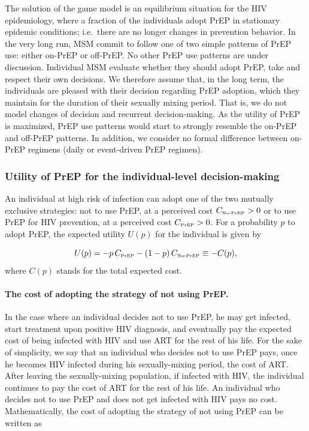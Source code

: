 \documentclass[12pt]{article}
\begin{document}
The solution of the game model is an equilibrium situation for the HIV epidemiology, where a fraction of the individuals adopt PrEP in stationary epidemic conditions; i.e.~there are no longer changes in prevention behavior. {In the very long run, MSM commit to follow one of two simple patterns of PrEP use: either on-PrEP or off-PrEP. No other PrEP use patterns are under discussion. Individual MSM evaluate whether they should adopt PrEP, take and respect their own decisions. We therefore assume that, in the long term, the individuals are pleased with their decision regarding PrEP adoption, which they maintain for the duration of their sexually mixing period. That is, we do not model changes of decision and recurrent decision-making.  As the utility of PrEP is maximized, PrEP use patterns would start to strongly resemble the on-PrEP and off-PrEP patterns. In addition, we consider no formal difference between on-PrEP regimens (daily or event-driven PrEP regimen).  
}

\subsubsection{Utility of PrEP for the individual-level decision-making} \label{sec:Utility}

An individual at high risk of infection can adopt one of the two mutually exclusive strategies: not to use PrEP, at a perceived cost $C_{\text{\tiny No-PrEP}}>0$ or to use PrEP for HIV prevention, at a perceived cost $C_{\text{\tiny PrEP}}>0$. For a probability $p$ to adopt PrEP, the expected utility $U(p)$ for the individual is given by 

\begin{equation}
	U(p) = - p \, C_{\text{\tiny PrEP}} - (1- p) \, C_{\text{\tiny No-PrEP}}\equiv-C(p), 
\end{equation}
where $C(p)$ stands for the total expected cost.

\paragraph{The cost of adopting the strategy of not using PrEP.}

In the case where an individual decides not to use PrEP, he may get infected, start treatment upon positive HIV diagnosis, and eventually pay the {expected} cost of {being infected with HIV and use} ART for the rest of his life. {For the sake of simplicity, we say} that an individual who decides not to use PrEP pays, once he becomes HIV infected during his sexually-mixing period, the cost of ART. After leaving the sexually-mixing population, if infected with HIV, the individual continues to pay the cost of ART for the rest of his life. An individual who decides not to use PrEP and does not get infected with HIV pays no cost. Mathematically, the cost of adopting the strategy of not using PrEP can be written as
\end{document}

